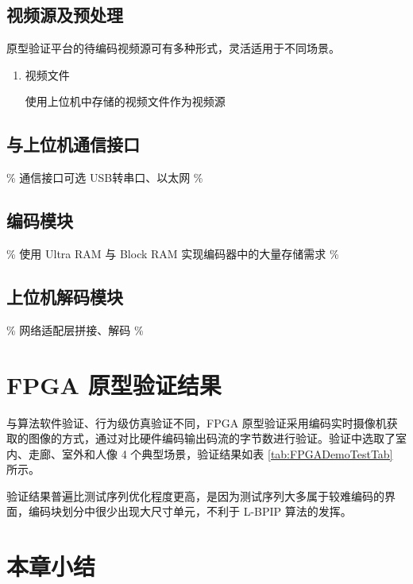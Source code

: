 \subsection{视频源及预处理}
原型验证平台的待编码视频源可有多种形式，灵活适用于不同场景。
\begin{enumerate}
    \item 视频文件
    
    使用上位机中存储的视频文件作为视频源
\end{enumerate}

\subsection{与上位机通信接口}
\% 通信接口可选 USB转串口、以太网 \%

\subsection{编码模块}
\% 使用 Ultra RAM 与 Block RAM 实现编码器中的大量存储需求 \%

\subsection{上位机解码模块}
\% 网络适配层拼接、解码 \%

\section{FPGA 原型验证结果}
与算法软件验证、行为级仿真验证不同，FPGA 原型验证采用编码实时摄像机获取的图像的方式，通过对比硬件编码输出码流的字节数进行验证。验证中选取了室内、走廊、室外和人像 4 个典型场景，验证结果如表 \ref{tab:FPGADemoTestTab} 所示。


验证结果普遍比测试序列优化程度更高，是因为测试序列大多属于较难编码的界面，编码块划分中很少出现大尺寸单元，不利于 L-BPIP 算法的发挥。

\section{本章小结}